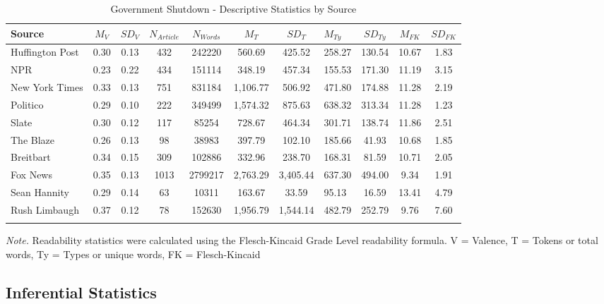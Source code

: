\documentclass[english,,man]{apa6}
\begin{document}
\begin{table}[tbp]
\begin{center}
\begin{threeparttable}
\caption{\label{tab:exp2-source-descriptives-gs}Government Shutdown - Descriptive Statistics by Source}
\small{
\begin{tabular}{lcccccclccc}
\toprule
Source & $M_V$ & $SD_V$ & $N_{Article}$ & $N_{Words}$ & $M_T$ & $SD_T$ & $M_{Ty}$ & $SD_{Ty}$ & $M_{FK}$ & $SD_{FK}$\\
\midrule
Huffington Post & 0.30 & 0.13 & 432 & 242220 & 560.69 & 425.52 & 258.27 & 130.54 & 10.67 & 1.83\\
NPR & 0.23 & 0.22 & 434 & 151114 & 348.19 & 457.34 & 155.53 & 171.30 & 11.19 & 3.15\\
New York Times & 0.33 & 0.13 & 751 & 831184 & 1,106.77 & 506.92 & 471.80 & 174.88 & 11.28 & 2.19\\
Politico & 0.29 & 0.10 & 222 & 349499 & 1,574.32 & 875.63 & 638.32 & 313.34 & 11.28 & 1.23\\
Slate & 0.30 & 0.12 & 117 & 85254 & 728.67 & 464.34 & 301.71 & 138.74 & 11.86 & 2.51\\
The Blaze & 0.26 & 0.13 & 98 & 38983 & 397.79 & 102.10 & 185.66 & 41.93 & 10.68 & 1.85\\
Breitbart & 0.34 & 0.15 & 309 & 102886 & 332.96 & 238.70 & 168.31 & 81.59 & 10.71 & 2.05\\
Fox News & 0.35 & 0.13 & 1013 & 2799217 & 2,763.29 & 3,405.44 & 637.30 & 494.00 & 9.34 & 1.91\\
Sean Hannity & 0.29 & 0.14 & 63 & 10311 & 163.67 & 33.59 & 95.13 & 16.59 & 13.41 & 4.79\\
Rush Limbaugh & 0.37 & 0.12 & 78 & 152630 & 1,956.79 & 1,544.14 & 482.79 & 252.79 & 9.76 & 7.60\\
\bottomrule
\addlinespace
\end{tabular}
}
\begin{tablenotes}[para]
\normalsize{\textit{Note.} Readability statistics were calculated using the Flesch-Kincaid Grade Level readability formula. V = Valence, T = Tokens or total words, Ty = Types or unique words, FK = Flesch-Kincaid}
\end{tablenotes}
\end{threeparttable}
\end{center}
\end{table}

\hypertarget{inferential-statistics-1}{%
\subsection{Inferential Statistics}\label{inferential-statistics-1}}
\end{document}
